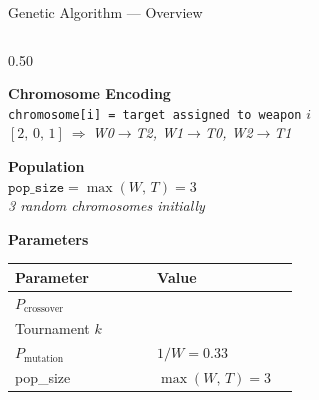 \documentclass[aspectratio=169,10pt]{beamer}
\begin{document}
\begin{frame}{Genetic Algorithm --- Overview}
  \begin{columns}[T]

    \begin{column}{0.50\textwidth}

      \colorbox{offwhiteHex}{\begin{minipage}{\linewidth}
        \vspace{3pt}
        {\normalsize\bfseries\color{navydark} Chromosome Encoding}\\[5pt]
        {\small\texttt{chromosome[i] = target assigned to weapon} $i$}\\[4pt]
        {\small\color{navymid}\itshape
          $[2,\,0,\,1]\ \Rightarrow\ $W0$\to$T2,\; W1$\to$T0,\; W2$\to$T1}
        \vspace{3pt}
      \end{minipage}}

      \vspace{0.20cm}

      \colorbox{offwhiteHex}{\begin{minipage}{\linewidth}
        \vspace{3pt}
        {\normalsize\bfseries\color{navydark} Population}\\[5pt]
        {\small $\texttt{pop\_size} = \max(W,\,T) = 3$}\\[4pt]
        {\small\color{navymid}\itshape 3 random chromosomes initially}
        \vspace{3pt}
      \end{minipage}}

      \vspace{0.20cm}

      \colorbox{offwhiteHex}{\begin{minipage}{\linewidth}
        \vspace{3pt}
        {\normalsize\bfseries\color{navydark} Parameters}\\[5pt]
        {\small
        \renewcommand{\arraystretch}{1}
        \begin{tabular}{@{}>{\raggedright\arraybackslash}p{0.45\linewidth}>{\raggedright\arraybackslash}p{0.45\linewidth}@{}}
          \toprule
          \rowcolor{navydark}
            \color{white}\bfseries Parameter & \color{white}\bfseries Value \\
          \midrule
          $P_{\text{crossover}}$ & 0.8 \\
          Tournament $k$         & 3 \\
          $P_{\text{mutation}}$  & $1/W = 0.33$ \\
          pop\_size              & $\max(W,\,T) = 3$ \\
          \bottomrule
        \end{tabular}
        }
        \vspace{3pt}
      \end{minipage}}


\end{column}
\end{columns}
\end{frame}
\end{document}
